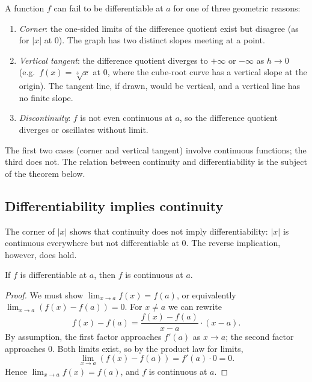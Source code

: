\begin{strategy}
A function \(f\) can fail to be differentiable at \(a\) for one of three geometric reasons:
\begin{enumerate}
    \item \emph{Corner}: the one-sided limits of the difference quotient exist but disagree (as for \(\lvert x \rvert\) at \(0\)). The graph has two distinct slopes meeting at a point.
    \item \emph{Vertical tangent}: the difference quotient diverges to \(+\infty\) or \(-\infty\) as \(h \to 0\) (e.g.\ \(f(x) = \sqrt[3]{x}\) at \(0\), where the cube-root curve has a vertical slope at the origin). The tangent line, if drawn, would be vertical, and a vertical line has no finite slope.
    \item \emph{Discontinuity}: \(f\) is not even continuous at \(a\), so the difference quotient diverges or oscillates without limit.
\end{enumerate}
The first two cases (corner and vertical tangent) involve continuous functions; the third does not. The relation between continuity and differentiability is the subject of the theorem below.
\end{strategy}

\subsection{Differentiability implies continuity}

The corner of \(\lvert x \rvert\) shows that continuity does not imply differentiability: \(\lvert x \rvert\) is continuous everywhere but not differentiable at \(0\). The reverse implication, however, does hold.

\begin{theorem}\label{thm:differentiable-implies-continuous}
If \(f\) is differentiable at \(a\), then \(f\) is continuous at \(a\).
\end{theorem}

\begin{proof}
We must show \(\lim_{x \to a} f(x) = f(a)\), or equivalently \(\lim_{x \to a} (f(x) - f(a)) = 0\). For \(x \neq a\) we can rewrite
\[
f(x) - f(a) = \frac{f(x) - f(a)}{x - a} \cdot (x - a).
\]
By assumption, the first factor approaches \(f'(a)\) as \(x \to a\); the second factor approaches \(0\). Both limits exist, so by the product law for limits,
\[
\lim_{x \to a} (f(x) - f(a)) = f'(a) \cdot 0 = 0.
\]
Hence \(\lim_{x \to a} f(x) = f(a)\), and \(f\) is continuous at \(a\).
\end{proof}

